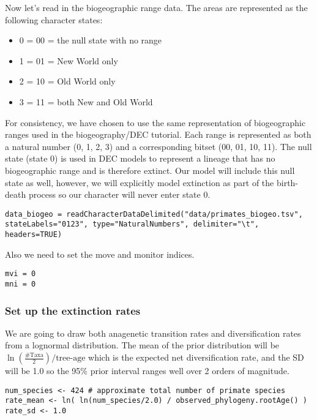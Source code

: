Now let's read in the biogeographic range data. The areas are represented as the following character states:
\begin{itemize}
\item 0 = 00 = the null state with no range
\item 1 = 01 = New World only
\item 2 = 10 = Old World only
\item 3 = 11 = both New and Old World
\end{itemize}
For consistency, we have chosen to use the same representation of biogeographic ranges used in the \RevBayes biogeography/DEC tutorial.
Each range is represented as both a natural number (0, 1, 2, 3) and a corresponding bitset (00, 01, 10, 11).
The null state (state 0) is used in DEC models to represent a lineage that has no biogeographic range and is therefore extinct.
Our model will include this null state as well, however, we will explicitly model extinction as part of the birth-death
process so our character will never enter state 0.
{\tt \begin{snugshade*}
\begin{lstlisting}
data_biogeo = readCharacterDataDelimited("data/primates_biogeo.tsv", stateLabels="0123", type="NaturalNumbers", delimiter="\t", headers=TRUE)
\end{lstlisting}
\end{snugshade*}}

Also we need to set the move and monitor indices.
{\tt \begin{snugshade*}
\begin{lstlisting}
mvi = 0
mni = 0
\end{lstlisting}
\end{snugshade*}}

\subsubsection{Set up the extinction rates}

We are going to draw both anagenetic transition rates
and diversification rates from a lognormal distribution.
The mean of the prior distribution will be 
$\ln(\frac{\text{\#Taxa}}{2}) / \text{tree-age}$
which is the expected net 
diversification rate, and the SD will be 1.0 so the 95\% 
prior interval ranges well over 2 orders of magnitude.
{\tt \begin{snugshade*}
\begin{lstlisting}
num_species <- 424 # approximate total number of primate species
rate_mean <- ln( ln(num_species/2.0) / observed_phylogeny.rootAge() )
rate_sd <- 1.0
\end{lstlisting}
\end{snugshade*}}

